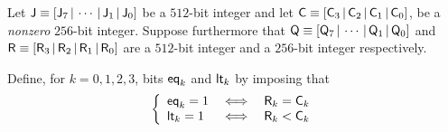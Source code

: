 \begin{lem}
Let 
$\mathsf{J} \equiv [\mathsf{J}_{7} \,|\, \cdots \,|\, \mathsf{J}_{1} \,|\, \mathsf{J}_{0}]$ be a $512$-bit integer
and let 
$\mathsf{C}\equiv[\mathsf{C}_{3} \,|\, \mathsf{C}_{2} \,|\, \mathsf{C}_{1} \,|\, \mathsf{C}_{0}]$,
be a \emph{nonzero} $256$-bit integer.
Suppose furthermore that
$\mathsf{Q} \equiv [\mathsf{Q}_{7} \,|\, \cdots \,|\, \mathsf{Q}_{1} \,|\, \mathsf{Q}_{0}]$
and
$\mathsf{R}\equiv[\mathsf{R}_{3} \,|\, \mathsf{R}_{2} \,|\, \mathsf{R}_{1} \,|\, \mathsf{R}_{0}]$
are a $512$-bit integer and a $256$-bit integer respectively.

Define, for $k = 0, 1, 2, 3$, bits
$\mathsf{eq}_{k}$ and
$\mathsf{lt}_{k}$ by imposing that
\[
	\left\{
	\begin{array}{lcc}
		\mathsf{eq}_{k} = 1	& \iff & \mathsf{R}_{k} = \mathsf{C}_{k}\\
		\mathsf{lt}_{k} = 1	& \iff & \mathsf{R}_{k} < \mathsf{C}_{k}\\
 	\end{array}
	\right.
\]


\end{lem}

